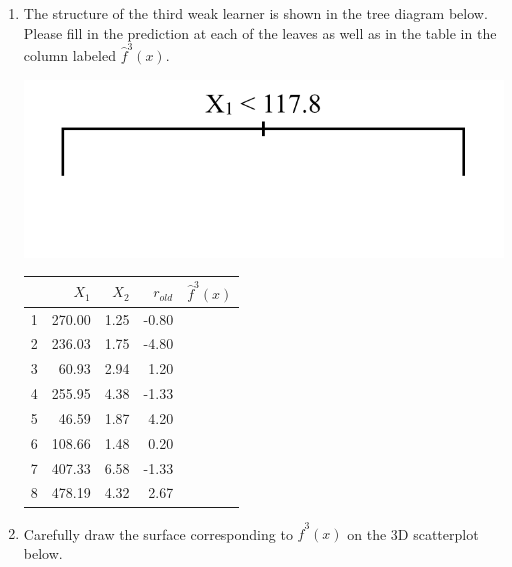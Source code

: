 \documentclass{article}\usepackage[]{graphicx}\usepackage[]{color}
\begin{document}
\begin{enumerate}
\item The structure of the third weak learner is shown in the tree diagram below. Please fill in the prediction at each of the leaves as well as in the table in the column labeled $\hat{f}^3(x)$.

\vspace{10mm}

\begin{minipage}[t]{.4\textwidth}
{\includegraphics[width=\textwidth]{treeC.png}}
\end{minipage}
\hfill
\begin{minipage}[t]{.4\textwidth}
\begin{tabular}{rrrrl}
  \hline
 & $X_1$ & $X_2$ & $r_{old}$ & $\hat{f}^3(x)$ \\ 
  \hline
1 & 270.00 & 1.25 & -0.80 &  \\ 
  2 & 236.03 & 1.75 & -4.80 &  \\ 
  3 & 60.93 & 2.94 & 1.20 &  \\ 
  4 & 255.95 & 4.38 & -1.33 &  \\ 
  5 & 46.59 & 1.87 & 4.20 &  \\ 
  6 & 108.66 & 1.48 & 0.20 &  \\ 
  7 & 407.33 & 6.58 & -1.33 &  \\ 
  8 & 478.19 & 4.32 & 2.67 &  \\ 
   \hline
\end{tabular}

\end{minipage}

\vspace{8mm}
\item Carefully draw the surface corresponding to $\hat{f}^3(x)$ on the 3D scatterplot below.

\vspace{-8mm}


\end{enumerate}
\end{document}
